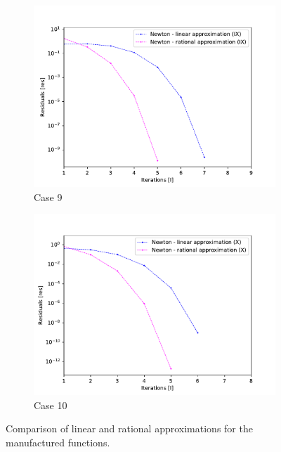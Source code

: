 \documentclass[11pt, oneside]{article}
\begin{document}
\begin{figure}
		\begin{subfigure}[b]{.45\linewidth}
			\includegraphics[width=\linewidth]{figure/9.pdf}
			\caption{Case 9}
		\end{subfigure}
		\begin{subfigure}[b]{.45\linewidth}
			\includegraphics[width=\linewidth]{figure/10.pdf}
			\caption{Case 10}
		\end{subfigure}
		\caption{Comparison of linear and rational approximations for the manufactured functions.}
		\label{fig:comparison2}
	\end{figure}
	
\end{document}
